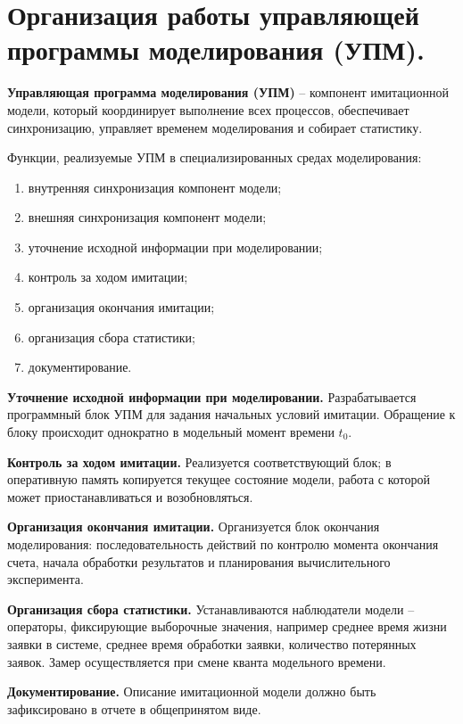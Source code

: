 \section{Организация работы управляющей программы моделирования (УПМ).}

\textbf{Управляющая программа моделирования (УПМ)} -- компонент имитационной модели, который координирует выполнение всех процессов, обеспечивает синхронизацию, управляет временем моделирования и собирает статистику.

Функции, реализуемые УПМ в специализированных средах моделирования:

\begin{enumerate}
  \item внутренняя синхронизация компонент модели;
  \item внешняя синхронизация компонент модели;
  \item уточнение исходной информации при моделировании;
  \item контроль за ходом имитации;
  \item организация окончания имитации;
  \item организация сбора статистики;
  \item документирование.
\end{enumerate}

\textbf{Уточнение исходной информации при моделировании.} Разрабатывается программный блок УПМ для задания начальных условий имитации. Обращение к блоку происходит однократно в модельный момент времени $t_0$.

\textbf{Контроль за ходом имитации.} Реализуется соответствующий блок; в оперативную память копируется текущее состояние модели, работа с которой может приостанавливаться и возобновляться.

\textbf{Организация окончания имитации.} Организуется блок окончания моделирования: последовательность действий по контролю момента окончания счета, начала обработки результатов и планирования вычислительного эксперимента.

\textbf{Организация сбора статистики.} Устанавливаются наблюдатели модели -- операторы, фиксирующие выборочные значения, например среднее время жизни заявки в системе, среднее время обработки заявки, количество потерянных заявок. Замер осуществляется при смене кванта модельного времени.

\textbf{Документирование.} Описание имитационной модели должно быть зафиксировано в отчете в общепринятом виде.

\clearpage
